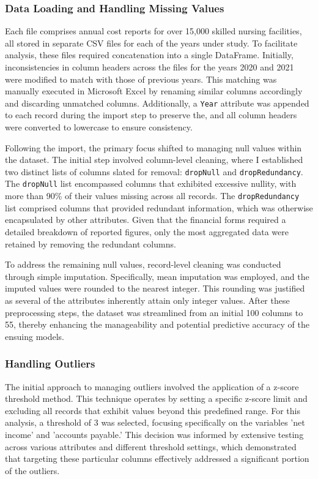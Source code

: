 \documentclass{article}
\theoremstyle{mytheoremstyle}
\theoremstyle{mytheoremstyle}
\theoremstyle{myproblemstyle}
\begin{document}
\subsubsection{Data Loading and Handling Missing Values}

Each file comprises annual cost reports for over 15,000 skilled nursing facilities, all stored in separate CSV files for each of the years under study. To facilitate analysis, these files required concatenation into a single DataFrame. Initially, inconsistencies in column headers across the files for the years 2020 and 2021 were modified to match with those of previous years. This matching was manually executed in Microsoft Excel by renaming similar columns accordingly and discarding unmatched columns. Additionally, a \texttt{Year} attribute was appended to each record during the import step to preserve the, and all column headers were converted to lowercase to ensure consistency.

Following the import, the primary focus shifted to managing null values within the dataset. The initial step involved column-level cleaning, where I established two distinct lists of columns slated for removal: \texttt{dropNull} and \texttt{dropRedundancy}. The \texttt{dropNull} list encompassed columns that exhibited excessive nullity, with more than 90\% of their values missing across all records. The \texttt{dropRedundancy} list comprised columns that provided redundant information, which was otherwise encapsulated by other attributes. Given that the financial forms required a detailed breakdown of reported figures, only the most aggregated data were retained by removing the redundant columns.

To address the remaining null values, record-level cleaning was conducted through simple imputation. Specifically, mean imputation was employed, and the imputed values were rounded to the nearest integer. This rounding was justified as several of the attributes inherently attain only integer values. After these preprocessing steps, the dataset was streamlined from an initial 100 columns to 55, thereby enhancing the manageability and potential predictive accuracy of the ensuing models.

\subsubsection{Handling Outliers}
The initial approach to managing outliers involved the application of a z-score threshold method. This technique operates by setting a specific z-score limit and excluding all records that exhibit values beyond this predefined range. For this analysis, a threshold of 3 was selected, focusing specifically on the variables 'net income' and 'accounts payable.' This decision was informed by extensive testing across various attributes and different threshold settings, which demonstrated that targeting these particular columns effectively addressed a significant portion of the outliers.
\end{document}

